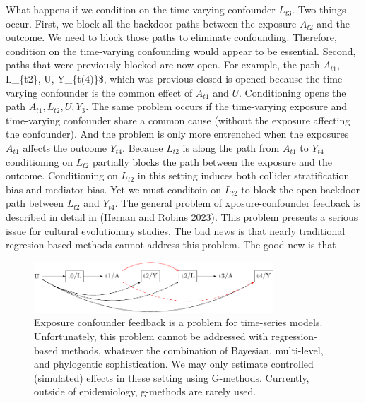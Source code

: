 \documentclass[
  singlecolumn]{report}
\begin{document}
What happens if we condition on the time-varying confounder \(L_{t3}\).
Two things occur. First, we block all the backdoor paths between the
exposure \(A_{t2}\) and the outcome. We need to block those paths to
eliminate confounding. Therefore, condition on the time-varying
confounding would appear to be essential. Second, paths that were
previously blocked are now open. For example, the path \(A_{t1}\),
L\_\{t2\}, U, Y\_\{t(4)\}\$, which was previous closed is opened because
the time varying confounder is the common effect of \(A_{t1}\) and
\(U\). Conditioning opens the path \(A_{t1}, L_{t2}, U, Y_{3}\). The
same problem occurs if the time-varying exposure and time-varying
confounder share a common cause (without the exposure affecting the
confounder). And the problem is only more entrenched when the exposures
\(A_{t1}\) affects the outcome \(Y_{t4}\). Because \(L_{t2}\) is along
the path from \(A_{t1}\) to \(Y_{t4}\) conditioning on \(L_{t2}\)
partially blocks the path between the exposure and the outcome.
Conditioning on \(L_{t2}\) in this setting induces both collider
stratification bias and mediator bias. Yet we must conditoin on
\(L_{t2}\) to block the open backdoor path between \(L_{t2}\) and
\(Y_{t4}\). The general problem of xposure-confounder feedback is
described in detail in (\protect\hyperlink{ref-hernan2023}{Hernan and
Robins 2023}). This problem presents a serious issue for cultural
evolutionary studies. The bad news is that nearly traditional regresion
based methods cannot address this problem. The good new is that

\begin{figure}

{\centering \includegraphics[width=0.8\textwidth,height=\textheight]{causal-dags_files/figure-pdf/fig-dag-9-1.pdf}

}

\caption{\label{fig-dag-9}Exposure confounder feedback is a problem for
time-series models. Unfortunately, this problem cannot be addressed with
regression-based methods, whatever the combination of Bayesian,
multi-level, and phylogentic sophistication. We may only estimate
controlled (simulated) effects in these setting using G-methods.
Currently, outside of epidemiology, g-methods are rarely used.}

\end{figure}
\end{document}
